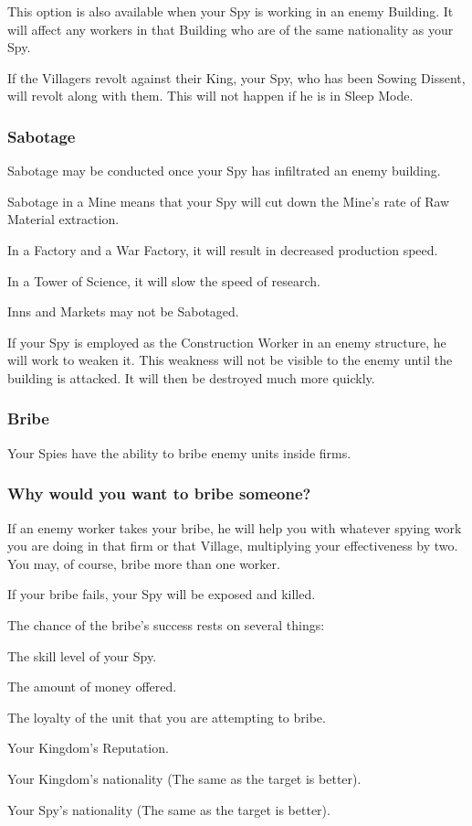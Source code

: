 This option is also available when your Spy is working in an enemy Building. It will affect any workers in that Building who are of the same nationality as your Spy.

If the Villagers revolt against their King, your Spy, who has been Sowing Dissent, will revolt along with them. This will not happen if he is in Sleep Mode.

\subsubsection{Sabotage}

Sabotage may be conducted once your Spy has infiltrated an enemy building.

Sabotage in a Mine means that your Spy will cut down the Mine’s rate of Raw Material extraction.

In a Factory and a War Factory, it will result in decreased production speed.

In a Tower of Science, it will slow the speed of research.

Inns and Markets may not be Sabotaged.

If your Spy is employed as the Construction Worker in an enemy structure, he will work to weaken it. This weakness will not be visible to the enemy until the building is attacked. It will then be destroyed much more quickly.

\subsubsection{Bribe}

Your Spies have the ability to bribe enemy units inside firms.

\subsubsection{Why would you want to bribe someone?}

If an enemy worker takes your bribe, he will help you with whatever spying work you are doing in that firm or that Village, multiplying your effectiveness by two. You may, of course, bribe more than one worker.

If your bribe fails, your Spy will be exposed and killed.

The chance of the bribe’s success rests on several things:

\begin{adjustwidth}{1cm}{}
The skill level of your Spy.

The amount of money offered.

The loyalty of the unit that you are attempting to bribe.

Your Kingdom’s Reputation.

Your Kingdom’s nationality (The same as the target is better).

Your Spy’s nationality (The same as the target is better).
\end{adjustwidth}

